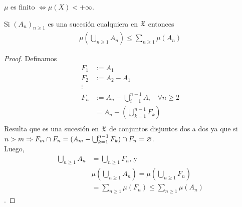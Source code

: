 \begin{corollary}
    $\mu$ es finito $\iff \mu(X) < +\infty$.
\end{corollary}

\clearpage

\begin{lemma}
    Si $(A_n)_{n \geq 1}$ es una sucesión cualquiera en $\mathfrak{X}$ entonces \begin{align*}
        \mu(\bigcup_{n \geq 1} A_n) \leq \sum_{n \geq 1} \mu(A_n)
    \end{align*}
    \begin{proof}
        Definamos \begin{align*}
            F_1    & := A_1                                                    \\
            F_2    & := A_2 - A_1                                              \\
            \vdots &                                                           \\
            F_n    & := A_n - \bigcup_{i = 1}^{n-1} A_i \quad \forall n \geq 2 \\
                   & = A_n - ( \bigcup_{k = 1}^{n-1} F_k )                     \\
        \end{align*}
        Resulta que es una sucesión en $\mathfrak{X}$ de conjuntos disjuntos dos a dos ya que si $n > m \Rightarrow F_m \cap F_n = (A_m - \bigcup_{k = 1}^{n-1} F_k) \cap F_n = \varnothing$. \\
        Luego, \begin{align*}
            \bigcup_{n \geq 1} A_n & = \bigcup_{n \geq 1} F_n \text{, y }                      \\
                                   & \mu(\bigcup_{n \geq 1} A_n) = \mu(\bigcup_{n \geq 1} F_n) \\
                                   & = \sum_{n \geq 1} \mu(F_n) \leq \sum_{n \geq 1} \mu(A_n)
        \end{align*}.
    \end{proof}
\end{lemma}

\clearpage

